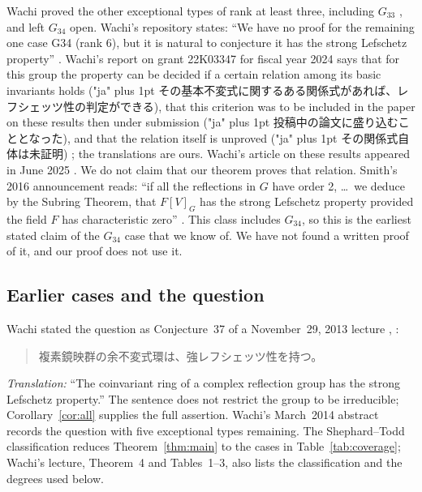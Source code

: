 \documentclass[11pt]{article}
\theoremstyle{definition}
\begin{document}
Wachi proved the other exceptional types of rank at least three,
including $G_{33}$ \cite{Wachi25,WachiCode}, and left $G_{34}$ open.
Wachi's repository states: ``We have no proof for the remaining one case
G34 (rank 6), but it is natural to conjecture it has the strong Lefschetz
property'' \cite{WachiCode}. Wachi's report on grant 22K03347 for fiscal
year 2024 says that for this group the property can be decided if a
certain relation among its basic invariants holds
({\japanesefont\XeTeXlinebreaklocale "ja"\XeTeXlinebreakskip=0pt plus 1pt その基本不変式に関するある関係式があれば、レフシェッツ性の判定ができる}),
that this criterion was to be included in the paper on these results
then under submission
({\japanesefont\XeTeXlinebreaklocale "ja"\XeTeXlinebreakskip=0pt plus 1pt 投稿中の論文に盛り込むこととなった}), and that the
relation itself is unproved
({\japanesefont\XeTeXlinebreaklocale "ja"\XeTeXlinebreakskip=0pt plus 1pt その関係式自体は未証明}) \cite{KAKEN22K03347}; the
translations are ours. Wachi's article on these results appeared in June
2025 \cite{Wachi25}. We do not claim that our theorem proves that
relation. Smith's 2016 announcement reads: ``if all the reflections in
$G$ have order 2, \dots\ we deduce by the Subring Theorem, that $F[V]_G$
has the strong Lefschetz property provided the field $F$ has
characteristic zero'' \cite[p.~6]{BIRS16}. This class includes $G_{34}$,
so this is the earliest stated claim of the $G_{34}$ case that we know
of. We have not found a written proof of it, and our proof does not use
it.

\subsection*{Earlier cases and the question}
Wachi stated the question as Conjecture~37 of a November~29, 2013
lecture \cite[Conjecture~37, proceedings p.~155, PDF p.~16]{WachiLecture},
\cite{WachiProgram}:
\begin{quote}
\japanesefont 複素鏡映群の余不変式環は、強レフシェッツ性を持つ。
\end{quote}
\noindent\emph{Translation:} ``The coinvariant ring of a complex
reflection group has the strong Lefschetz property.''
The sentence does not restrict the group to be irreducible;
Corollary~\ref{cor:all} supplies the full assertion. Wachi's March~2014
abstract \cite[Functional Analysis, talk~12, p.~78]{WachiAbstract}
records the question with five exceptional types remaining. The
Shephard--Todd classification \cite{ST} reduces Theorem~\ref{thm:main}
to the cases in Table~\ref{tab:coverage}; Wachi's lecture, Theorem~4 and
Tables~1--3, also lists the classification and the degrees used below.
\end{document}
